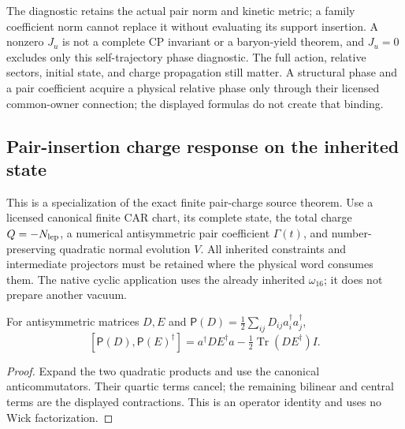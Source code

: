 \documentclass[12pt,a4paper]{article}
\begin{document}
\begin{remark}
\label{p4:rem:v4102-relative-phase-scope}
The diagnostic retains the actual pair norm and kinetic metric; a family
coefficient norm cannot replace it without evaluating its support insertion.
A nonzero $J_u$ is not a complete CP invariant or a baryon-yield theorem,
and $J_u=0$ excludes only this self-trajectory phase diagnostic.  The full
action, relative sectors, initial state, and charge propagation still matter.
A structural phase and a pair coefficient acquire a physical relative phase
only through their licensed common-owner connection; the displayed formulas
do not create that binding.
\end{remark}




\subsection{Pair-insertion charge response on the inherited state}
\label{p4:sec:v2167-inherited-pair-charge}
This is a specialization of the exact finite pair-charge source theorem.
Use a licensed canonical finite CAR chart, its complete state, the total
charge $Q=-N_{\rm lep}$, a numerical antisymmetric pair coefficient
$\Gamma(t)$, and number-preserving quadratic normal evolution $V$.
All inherited constraints and intermediate projectors must be retained
where the physical word consumes them. The native cyclic application uses
the already inherited $\omega_{16}$; it does not prepare another vacuum.

\begin{lemma}
\label{p4:lem:v2167-pair-commutator}
For antisymmetric matrices $D,E$ and
$\mathsf P(D)=\frac12\sum_{ij}D_{ij}a_i^\dagger a_j^\dagger$,
\[
 [\mathsf P(D),\mathsf P(E)^\dagger]
 =a^\dagger DE^\dagger a-\tfrac12\operatorname{Tr}(DE^\dagger)I.
\]
\end{lemma}
\begin{proof}
Expand the two quadratic products and use the canonical
anticommutators. Their quartic terms cancel; the remaining bilinear and
central terms are the displayed contractions. This is an operator
identity and uses no Wick factorization.
\end{proof}
\end{document}
